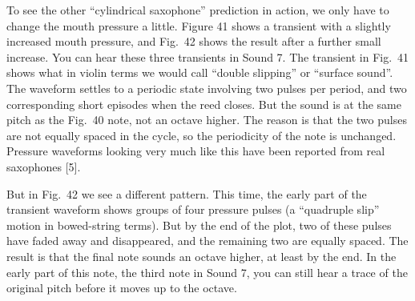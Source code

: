 
  To see the other “cylindrical saxophone” prediction in action, we only have 
  to change the mouth pressure a little. Figure 41 shows a transient with a 
  slightly increased mouth pressure, and Fig.\ 42 shows the result after a 
  further small increase. You can hear these three transients in Sound 7. The 
  transient in Fig.\ 41 shows what in violin terms we would call “double 
  slipping” or “surface sound”. The waveform settles to a periodic state 
  involving two pulses per period, and two corresponding short episodes when 
  the reed closes. But the sound is at the same pitch as the Fig.\ 40 note, not 
  an octave higher. The reason is that the two pulses are not equally spaced in 
  the cycle, so the periodicity of the note is unchanged. Pressure waveforms 
  looking very much like this have been reported from real saxophones [5]. 



\audio{}

  But in Fig.\ 42 we see a different pattern. This time, the early part of the 
  transient waveform shows groups of four pressure pulses (a “quadruple slip” 
  motion in bowed-string terms). But by the end of the plot, two of these 
  pulses have faded away and disappeared, and the remaining two are equally 
  spaced. The result is that the final note sounds an octave higher, at least 
  by the end. In the early part of this note, the third note in Sound 7, you 
  can still hear a trace of the original pitch before it moves up to the 
  octave. 

